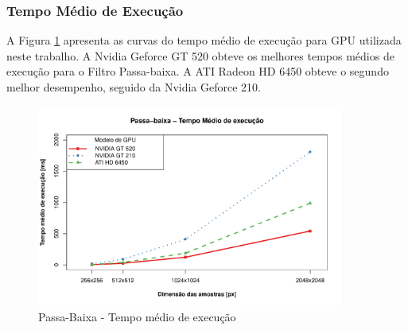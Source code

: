 \subsubsection{Tempo Médio de Execução}
A Figura \ref{fig:passa_tempo} apresenta as curvas do tempo médio de execução para GPU utilizada neste trabalho. A Nvidia Geforce GT 520 obteve os melhores tempos médios de execução para o Filtro Passa-baixa. A ATI Radeon HD 6450 obteve o segundo melhor desempenho, seguido da Nvidia Geforce 210.  
\begin{figure}[!ht]
\centering
\includegraphics[width=0.9\textwidth]{fft_tempo_medio_exec.pdf}
\caption{Passa-Baixa - Tempo médio de execução}
\label{fig:passa_tempo}
\end{figure}
\FloatBarrier
